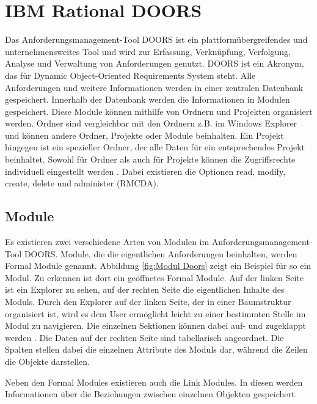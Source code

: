 \section{IBM Rational DOORS}
\label{chap:DOORS}

Das Anforderungsmanagement-Tool \ac{DOORS} ist ein plattformübergreifendes und unternehmensweites Tool und wird
zur Erfassung, Verknüpfung, Verfolgung, Analyse und Verwaltung von Anforderungen genutzt. \ac{DOORS} ist ein Akronym,
das für Dynamic Object-Oriented Requirements System steht. Alle Anforderungen und weitere Informationen werden in einer zentralen Datenbank
gespeichert. Innerhalb der Datenbank werden die Informationen in Modulen gespeichert. Diese Module können mithilfe von Ordnern und Projekten
organisiert werden. Ordner sind vergleichbar mit den Ordnern z.B. im Windows Explorer und können andere Ordner, Projekte oder Module
beinhalten. Ein Projekt hingegen ist ein spezieller Ordner, der alle Daten für ein entsprechendes Projekt beinhaltet. Sowohl für 
Ordner als auch für Projekte können die Zugriffsrechte individuell eingestellt werden \cite[vgl. S.173]{DOORS}. Dabei existieren die Optionen
read, modify, create, delete und administer (RMCDA). 

\subsection{Module}
Es existieren zwei verschiedene Arten von Modulen im Anforderungsmanagement-Tool \ac{DOORS}. Module, die die eigentlichen Anforderungen
beinhalten, werden Formal Module genannt. Abbildung \ref*{fig:Modul Doors} zeigt ein Beispiel für so ein Modul. Zu erkennen ist dort
ein geöffnetes Formal Module. Auf der linken Seite ist ein Explorer zu sehen, auf der rechten Seite die eigentlichen Inhalte des Moduls.
Durch den Explorer auf der linken Seite, der in einer Baumstruktur organisiert ist, wird es dem User ermöglicht leicht zu einer bestimmten
Stelle im Modul zu navigieren. Die einzelnen Sektionen können dabei auf- und zugeklappt werden \cite[vgl. S.176]{DOORS}. Die Daten auf der 
rechten Seite sind tabellarisch angeordnet. Die Spalten stellen dabei die einzelnen Attribute des Moduls dar, während die Zeilen die 
Objekte darstellen. 

Neben den Formal Modules existieren auch die Link Modules. In diesen werden Informationen über die Beziehungen zwischen einzelnen Objekten
gespeichert.

